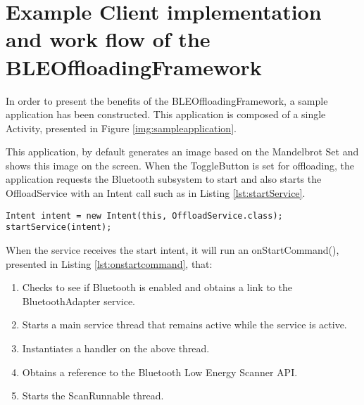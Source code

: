 \chapter{Example Client implementation and work flow of the BLEOffloadingFramework}
\label{appendix:clientimplementation}



In order to present the benefits of the BLEOffloadingFramework, a sample application has been constructed. This application is composed of a single Activity, presented in Figure \ref{img:sampleapplication}.

This application, by default generates an image based on the Mandelbrot Set and shows this image on the screen. When the ToggleButton is set for offloading, the application requests the Bluetooth subsystem to start and also starts the OffloadService with an Intent call such as in Listing \ref{lst:startService}.

\lstset{language=java,caption=Starting the OffloadService through an Intent,label=lst:startService}
\begin{lstlisting}
Intent intent = new Intent(this, OffloadService.class);
startService(intent);
\end{lstlisting}

When the service receives the start intent, it will run an onStartCommand(), presented in Listing \ref{lst:onstartcommand}, that:

\begin{enumerate}
\item{Checks to see if Bluetooth is enabled and obtains a link to the BluetoothAdapter service.}
\item{Starts a main service thread that remains active while the service is active.}
\item{Instantiates a handler on the above thread.}
\item{Obtains a reference to the Bluetooth Low Energy Scanner API.}
\item{Starts the ScanRunnable thread.}
\end{enumerate}

